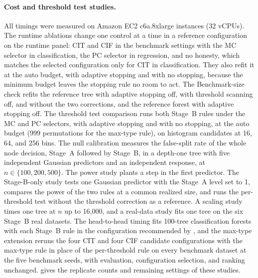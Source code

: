 \paragraph{Cost and threshold test studies.}
All timings were measured on Amazon EC2 c6a.8xlarge instances (32 vCPUs).
The runtime ablations change one control at a time in a reference
configuration on the runtime panel: CIT and CIF in the benchmark settings with
the MC selector in classification, the PC selector in regression, and no
honesty, which matches the selected configuration only for CIT in
classification. They also refit it at the auto budget, with adaptive stopping and
with no stopping, because the minimum budget leaves the stopping rule no room to
act. The
Benchmark-size check refits the reference tree with adaptive stopping off, with threshold
scanning off, and without the two corrections, and the reference forest
with adaptive stopping off.
\label{sec:experiments-stageB}%
The threshold test comparison runs both Stage~B rules under the MC and PC
selectors, with adaptive stopping and with no stopping, at the auto budget (999
permutations for the max-type rule), on histogram candidates at 16, 64, and 256
bins. The null calibration measures the false-split rate of the whole node
decision, Stage~A followed by Stage~B, in a depth-one tree with five
independent Gaussian predictors and an independent response, at
$n\in\{100,200,500\}$. The power study plants a step in the first predictor.
The Stage-B-only study tests one Gaussian predictor with the Stage~A level set
to 1, compares the power of the two rules at a common realized size, and runs
the per-threshold test without the threshold correction as a reference. A
scaling study times one tree at $n$ up to 16{,}000, and a real-data study fits
one tree on the six Stage~B real datasets.
\label{sec:experiments-h2h}%
\label{sec:experiments-maxt}%
The head-to-head timing fits 100-tree classification forests with each Stage~B
rule in the configuration recommended by
\citet{MilletichDownesHirst2026citrees}, and the max-type extension reruns the
four CIT and four CIF candidate configurations with the max-type rule in place
of the per-threshold rule on every benchmark dataset at the five benchmark
seeds, with evaluation, configuration selection, and ranking unchanged.  gives the replicate counts and remaining settings of
these studies.
